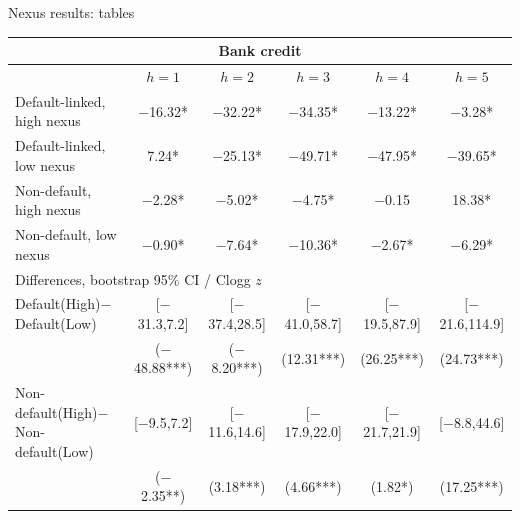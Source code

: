 \documentclass[aspectratio=169]{beamer}
\begin{document}
\begin{frame}{Nexus results: tables}
  \tiny
  \begin{center}
  \begin{tabular*}{0.92\linewidth}{@{\extracolsep{\fill}}lccccc}
  \multicolumn{6}{c}{\normalsize Bank credit} \\
  \toprule
   & $h=1$ & $h=2$ & $h=3$ & $h=4$ & $h=5$ \\
  \midrule
  Default-linked, high nexus & $-$16.32* & $-$32.22* & $-$34.35* & $-$13.22* & $-$3.28* \\
  Default-linked, low nexus & 7.24* & $-$25.13* & $-$49.71* & $-$47.95* & $-$39.65* \\
  Non-default, high nexus & $-$2.28* & $-$5.02* & $-$4.75* & $-$0.15 & 18.38* \\
  Non-default, low nexus & $-$0.90* & $-$7.64* & $-$10.36* & $-$2.67* & $-$6.29* \\
  \midrule
  \multicolumn{6}{l}{Differences, bootstrap 95\% CI / Clogg $z$} \\[1pt]
  Default(High)$-$Default(Low) & [$-$31.3,7.2] & [$-$37.4,28.5] & [$-$41.0,58.7] & [$-$19.5,87.9] & [$-$21.6,114.9] \\
   & ($-$48.88***) & ($-$8.20***) & (12.31***) & (26.25***) & (24.73***) \\[2pt]
  Non-default(High)$-$Non-default(Low) & [$-$9.5,7.2] & [$-$11.6,14.6] & [$-$17.9,22.0] & [$-$21.7,21.9] & [$-$8.8,44.6] \\
   & ($-$2.35**) & (3.18***) & (4.66***) & (1.82*) & (17.25***) \\
  \bottomrule
  \end{tabular*}
  \end{center}
\end{frame}
\end{document}
